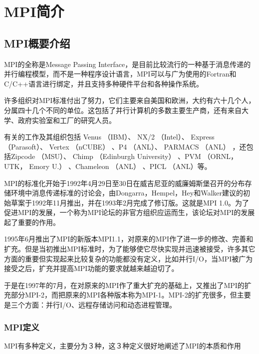 
\chapter[MPI简介]{MPI简介}
\section{MPI概要介绍}
MPI的全称是Message Passing Interface，是目前比较流行的一种基于消息传递的并行编程模型，而不是一种程序设计语言，MPI可以与广为使用的Fortran和C/C++语言进行绑定，并且支持多种硬件平台和各种操作系统。

许多组织对MPI标准付出了努力，它们主要来自美国和欧洲，大约有六十几个人，分属四十几个不同的单位。这包括了并行计算机的多数主要生产商，还有来自大学、政府实验室和工厂的研究人员。

 有关的工作及其组织包括 Venus （IBM）、 NX/2 （Intel）、 Express （Parasoft）、 Vertex （nCUBE） 、P4 （ANL）、 PARMACS （ANL） ，还包括Zipcode （MSU）、 Chimp （Edinburgh University） 、PVM （ORNL， UTK， Emory U.） 、Chameleon （ANL） 、PICL （ANL）等。

MPI的标准化开始于1992年4月29日至30日在威吉尼亚的威廉姆斯堡召开的分布存储环境中消息传递标准的讨论会，由Dongarra，Hempel，Hey和Walker建议的初始草案于1992年11月推出，并在1993年2月完成了修订版。这就是MPI 1.0。为了促进MPI的发展，一个称为MPI论坛的非官方组织应运而生，该论坛对MPI的发展起了重要的作用。

1995年6月推出了MPI的新版本MPI1.1，对原来的MPI作了进一步的修改、完善和扩充。但是当初推出MPI标准时，为了能够使它尽快实现并迅速被接受，许多其它方面的重要但实现起来比较复杂的功能都没有定义，比如并行I/O，当MPI被广为接受之后，扩充并提高MPI功能的要求就越来越迫切了。

于是在1997年的7月，在对原来的MPI作了重大扩充的基础上，又推出了MPI的扩充部分MPI-2，而把原来的MPI各种版本称为MPI-1。MPI-2的扩充很多，但主要是三个方面：并行I/O、远程存储访问和动态进程管理。

\subsection{MPI定义}
MPI有多种定义，主要分为３种，这３种定义很好地阐述了MPI的本质和作用

